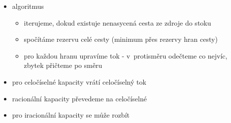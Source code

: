 \begin{itemize}
\begin{itemize}
\item algoritmus
\begin{itemize}
\item iterujeme, dokud existuje nenasycená cesta ze zdroje do stoku
\item spočítáme rezervu celé cesty (minimum přes rezervy hran cesty)
\item pro každou hranu upravíme tok - v~protisměru odečteme co nejvíc, zbytek přičteme po směru
\end{itemize}
\item pro celočíselné kapacity vrátí celočíselný tok
\item racionální kapacity převedeme na celočíselné
\item pro iracionální kapacity se může rozbít
\end{itemize}
\end{itemize}
